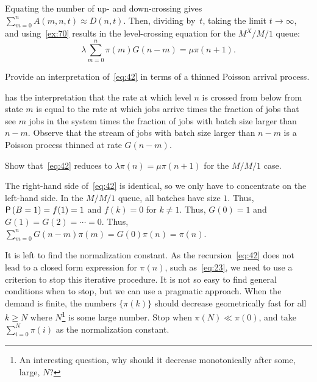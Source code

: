 Equating the number of up- and down-crossing gives $\sum_{m=0}^n A(m,n,t) \approx D(n,t)$. 
Then, dividing by~$t$, taking the limit $t\to\infty$, and using~\cref{ex:70} results in the level-crossing equation for the $M^X/M/1$ queue:
\begin{equation}\label{eq:42}
\lambda \sum_{m=0}^n \pi(m) G(n-m) = \mu \pi(n+1).
\end{equation}

\begin{exercise}
Provide an interpretation of~\cref{eq:42} in terms of a thinned Poisson arrival process.
\begin{solution}
  has the interpretation that the rate at which level $n$ is crossed from below from state $m$ is equal to the rate at which jobs arrive times the fraction of jobs that see $m$ jobs in the system times the fraction of jobs with batch size larger than $n-m$.
 Observe that the stream of jobs with batch size larger than $n-m$ is a Poisson process thinned at rate $G(n-m)$.
\end{solution}
\end{exercise}


\begin{extra}
 Show that~\cref{eq:42} reduces to $\lambda \pi(n) = \mu \pi(n+1)$ for the $M/M/1$ case.
\begin{solution}
 The right-hand side of~\cref{eq:42} is identical, so we only have to concentrate on the left-hand side.
 In the $M/M/1$ queue, all batches have size $1$.
 Thus, $\P{B=1} = f(1)=1$ and $f(k)=0$ for $k\neq 1$.
 Thus, $G(0)=1$ and $G(1)=G(2)=\cdots = 0$.
 Thus, $\sum_{m=0}^n G(n-m) \pi(m) = G(0)\pi(n)=\pi(n)$.
\end{solution}
\end{extra}



It is left to find the normalization constant.
As the recursion~\cref{eq:42} does not lead to a closed form expression for $\pi(n)$, such as~\cref{eq:23}, we need to use a criterion to stop this iterative procedure.
It is not so easy to find general conditions when to stop, but we can use a pragmatic approach.
When the demand is finite, the numbers $\{\pi(k)\}$ should decrease geometrically fast for all $k\geq N$ where $N$\footnote{An interesting question, why should it decrease monotonically after some, large, $N$?}
is some large number.
Stop when $\pi(N)\ll \pi(0)$, and take $\sum_{i=0}^N \pi(i)$ as the normalization constant.


